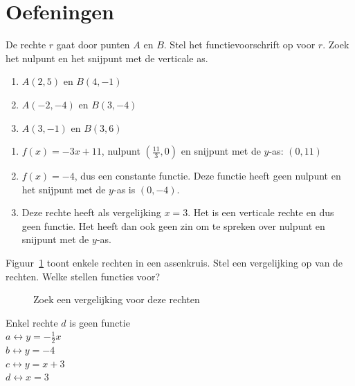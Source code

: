 \section{Oefeningen}
\begin{oef}
De rechte $r$ gaat door punten $A$ en $B$. Stel het functievoorschrift op voor $r$. Zoek het nulpunt en het snijpunt met de verticale as.
\begin{enumerate}
\item $A(2,5)$ en $B(4,-1)$
\item $A(-2,-4)$ en $B(3,-4)$
\item $A(3,-1)$ en $B(3,6)$ 
\end{enumerate}
     \begin{opl}
\begin{enumerate}
\item $f(x)=-3x+11$, nulpunt $(\frac{11}{3}, 0)$ en snijpunt met de $y$-as: $(0,11)$
\item $f(x)=-4$, dus een constante functie. Deze functie heeft geen nulpunt en het snijpunt met de $y$-as is $(0,-4)$.
\item Deze rechte heeft als vergelijking $x=3$. Het is een verticale rechte en dus geen functie. Het heeft dan ook geen zin om te spreken over nulpunt en snijpunt met de $y$-as.
\end{enumerate}
     \end{opl}
\end{oef}

\begin{oef}
Figuur~\ref{fig:rechtenoef2} toont enkele rechten in een assenkruis. Stel een vergelijking op van de rechten. Welke stellen functies voor?
\begin{figure}[htbp]
    \centering
{}
\caption{Zoek een vergelijking voor deze rechten}
    \label{fig:rechtenoef2}
\end{figure}
\begin{opl} Enkel rechte $d$ is geen functie \\
$a\leftrightarrow y=-\frac{1}{2}x$\\
$b \leftrightarrow y=-4 $\\
$c \leftrightarrow y=x+3$\\
$d \leftrightarrow x=3$
\end{opl}
\end{oef}


